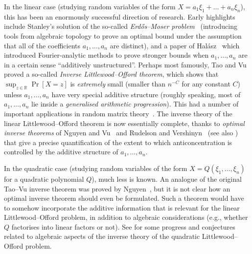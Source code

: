\documentclass[english]{article}
\theoremstyle{remark}
\numberwithin{equation}{section}
\numberwithin{figure}{section}
\newcommand{\RR}{\mathbb{R}}
\begin{document}
In the linear case (studying random variables of the form $X=a_{1}\xi_{1}+\dots+a_{n}\xi_{n}$),
this has been an enormously successful direction of research. Early
highlights include Stanley's solution of the so-called \emph{Erd\H os--Moser
problem}~\cite{Sta80} (introducing tools from algebraic topology to prove an optimal
bound under the assumption that all of the coefficients $a_{1},\dots,a_n$
are distinct), and a paper of Hal\'asz~\cite{Hal77} which introduced
Fourier-analytic methods to prove stronger bounds when $a_{1},\dots,a_n$
are in a certain sense ``additively unstructured''. Perhaps most
famously, Tao and Vu~\cite{TV09} proved a so-called \emph{Inverse
Littlewood--Offord theorem}, which shows that $\sup_{z\in\RR}\Pr[X=z]$
is \emph{extremely} small (smaller than $n^{-C}$ for any constant
$C$) unless $a_{1},\dots,a_n$ have very special additive structure (roughly
speaking, most of $a_{1},\dots,a_n$ lie inside a \emph{generalised arithmetic
progression}). This had a number of important applications in random
matrix theory~\cite{TV07,TV09a,TV09}. The inverse theory of the linear
Littlewood--Offord theorem is now essentially complete, thanks to \emph{optimal inverse theorems} of Nguyen and Vu~\cite{NV11} and Rudelson
and Vershinyn~\cite{RV08} (see also \cite{TV10}) that give a precise quantification of the
extent to which anticoncentration is controlled by the additive structure
of $a_{1},\dots,a_n$.

In the quadratic case (studying random variables of the form $X=Q(\xi_{1},\dots,\xi_{n})$
for a quadratic polynomial $Q$), much less is known.
An analogue of the original Tao--Vu inverse theorem was proved by
Nguyen~\cite{Ngu12}, but it is not clear how an optimal inverse theorem
should even be formulated. Such a theorem would have to somehow incorporate
the additive information that is relevant for the linear Littlewood--Offord
problem, in addition to algebraic considerations (e.g., whether $Q$
factorises into linear factors or not). See \cite{Cos13,Kan17,KS20} for some progress and conjectures
related to algebraic aspects of the inverse theory of the quadratic Littlewood--Offord problem.



\end{document}
